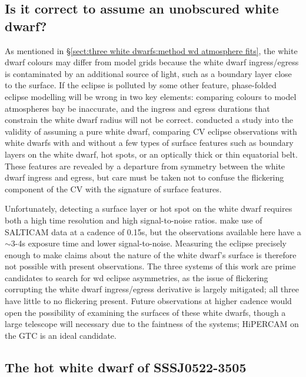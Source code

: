 \subsection{Is it correct to assume an unobscured white dwarf?}
\label{sect:impure white dwarf discussion}

As mentioned in \S\ref{sect:three white dwarfs:method wd atmosphere fits}, the white dwarf colours may differ from model grids because the white dwarf ingress/egress is contaminated by an additional source of light, such as a boundary layer close to the surface.
If the eclipse is polluted by some other feature, phase-folded eclipse modelling will be wrong in two key elements: comparing colours to model atmospheres bay be inaccurate, and the ingress and egress durations that constrain the white dwarf radius will not be correct.
\citet{Spark2015} conducted a study into the validity of assuming a pure white dwarf, comparing CV eclipse observations with white dwarfs with and without a few types of surface features such as boundary layers on the white dwarf, hot spots, or an optically thick or thin equatorial belt.
These features are revealed by a departure from symmetry between the white dwarf ingress and egress, but care must be taken not to confuse the flickering component of the CV with the signature of surface features.

Unfortunately, detecting a surface layer or hot spot on the white dwarf requires both a high time resolution and high signal-to-noise ratios. \citet{Spark2015} make use of SALTICAM data at a cadence of 0.15s, but the observations available here have a $\sim$3-4s exposure time and lower signal-to-noise. Measuring the eclipse precisely enough to make claims about the nature of the white dwarf's surface is therefore not possible with present observations.
The three systems of this work are prime candidates to search for wd eclipse asymmetries, as the issue of flickering corrupting the white dwarf ingress/egress derivative is largely mitigated; all three have little to no flickering present.
Future observations at higher cadence would open the possibility of examining the surfaces of these white dwarfs, though a large telescope will necessary due to the faintness of the systems; HiPERCAM on the GTC is an ideal candidate.


\subsection{The hot white dwarf of SSSJ0522-3505}
\label{sect:SSSJ0522-3505 white dwarf temperature discussion}

